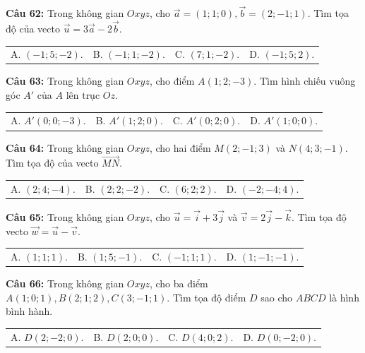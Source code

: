 \documentclass[12pt]{article}
\begin{document}
	\vspace{2mm}
	\noindent \textbf{Câu 62:} Trong không gian $Oxyz$, cho $\vec{a} = (1; 1; 0), \vec{b} = (2; -1; 1)$. Tìm tọa độ của vecto $\vec{u} = 3\vec{a} - 2\vec{b}$. \\
	\noindent
	\begin{tabular}{p{} p{} p{} p{}}
		A. $(-1; 5; -2)$. & B. $(-1; 1; -2)$. & C. $(7; 1; -2)$. & D. $(-1; 5; 2)$.
	\end{tabular}
	
	\vspace{2mm}
	\noindent \textbf{Câu 63:} Trong không gian $Oxyz$, cho điểm $A(1; 2; -3)$. Tìm hình chiếu vuông góc $A'$ của $A$ lên trục $Oz$. \\
	\noindent
	\begin{tabular}{p{} p{} p{} p{}}
		A. $A'(0; 0; -3)$. & B. $A'(1; 2; 0)$. & C. $A'(0; 2; 0)$. & D. $A'(1; 0; 0)$.
	\end{tabular}
	
	\vspace{2mm}
	\noindent \textbf{Câu 64:} Trong không gian $Oxyz$, cho hai điểm $M(2; -1; 3)$ và $N(4; 3; -1)$. Tìm tọa độ của vecto $\vec{MN}$. \\
	\noindent
	\begin{tabular}{p{} p{} p{} p{}}
		A. $(2; 4; -4)$. & B. $(2; 2; -2)$. & C. $(6; 2; 2)$. & D. $(-2; -4; 4)$.
	\end{tabular}
	
	\vspace{2mm}
	\noindent \textbf{Câu 65:} Trong không gian $Oxyz$, cho $\vec{u} = \vec{i} + 3\vec{j}$ và $\vec{v} = 2\vec{j} - \vec{k}$. Tìm tọa độ vecto $\vec{w} = \vec{u} - \vec{v}$. \\
	\noindent
	\begin{tabular}{p{} p{} p{} p{}}
		A. $(1; 1; 1)$. & B. $(1; 5; -1)$. & C. $(-1; 1; 1)$. & D. $(1; -1; -1)$.
	\end{tabular}
	
	\vspace{2mm}
	\noindent \textbf{Câu 66:} Trong không gian $Oxyz$, cho ba điểm $A(1; 0; 1), B(2; 1; 2), C(3; -1; 1)$. Tìm tọa độ điểm $D$ sao cho $ABCD$ là hình bình hành. \\
	\noindent
	\begin{tabular}{p{} p{} p{} p{}}
		A. $D(2; -2; 0)$. & B. $D(2; 0; 0)$. & C. $D(4; 0; 2)$. & D. $D(0; -2; 0)$.
	\end{tabular}
	
\end{document}
